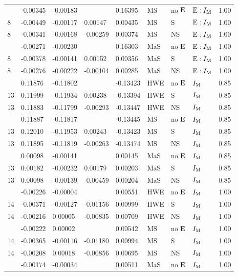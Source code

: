 \begin{longtable}[t]{lllllllll}
\addlinespace
8 & -0.00345 & -0.00183 &  & 0.16395 & MS & no ${\rm E}$ & ${\rm E}:I_{{\rm M}}$ & 1.00\\
8 & -0.00449 & -0.00117 & 0.00147 & 0.00435 & MS & S & ${\rm E}:I_{{\rm M}}$ & 1.00\\
8 & -0.00341 & -0.00168 & -0.00259 & 0.00374 & MS & NS & ${\rm E}:I_{{\rm M}}$ & 1.00\\
\addlinespace
8 & -0.00271 & -0.00230 &  & 0.16303 & MaS & no ${\rm E}$ & ${\rm E}:I_{{\rm M}}$ & 1.00\\
8 & -0.00378 & -0.00141 & 0.00152 & 0.00356 & MaS & S & ${\rm E}:I_{{\rm M}}$ & 1.00\\
8 & -0.00276 & -0.00222 & -0.00104 & 0.00285 & MaS & NS & ${\rm E}:I_{{\rm M}}$ & 1.00\\
\addlinespace
13 & 0.11876 & -0.11802 &  & -0.13423 & HWE & no ${\rm E}$ & $I_{{\rm M}}$ & 0.85\\
13 & 0.11999 & -0.11934 & 0.00238 & -0.13394 & HWE & S & $I_{{\rm M}}$ & 0.85\\
13 & 0.11883 & -0.11799 & -0.00293 & -0.13447 & HWE & NS & $I_{{\rm M}}$ & 0.85\\
\addlinespace
13 & 0.11887 & -0.11817 &  & -0.13445 & MS & no ${\rm E}$ & $I_{{\rm M}}$ & 0.85\\
13 & 0.12010 & -0.11953 & 0.00243 & -0.13423 & MS & S & $I_{{\rm M}}$ & 0.85\\
13 & 0.11895 & -0.11819 & -0.00263 & -0.13474 & MS & NS & $I_{{\rm M}}$ & 0.85\\
\addlinespace
13 & 0.00098 & -0.00141 &  & 0.00145 & MaS & no ${\rm E}$ & $I_{{\rm M}}$ & 0.85\\
13 & 0.00182 & -0.00232 & 0.00179 & 0.00203 & MaS & S & $I_{{\rm M}}$ & 0.85\\
13 & 0.00098 & -0.00139 & -0.00459 & 0.00204 & MaS & NS & $I_{{\rm M}}$ & 0.85\\
\addlinespace
14 & -0.00226 & -0.00004 &  & 0.00551 & HWE & no ${\rm E}$ & $I_{{\rm M}}$ & 1.00\\
14 & -0.00371 & -0.00127 & -0.01156 & 0.00999 & HWE & S & $I_{{\rm M}}$ & 1.00\\
14 & -0.00216 & 0.00005 & -0.00835 & 0.00709 & HWE & NS & $I_{{\rm M}}$ & 1.00\\
\addlinespace
14 & -0.00222 & 0.00002 &  & 0.00542 & MS & no ${\rm E}$ & $I_{{\rm M}}$ & 1.00\\
14 & -0.00365 & -0.00116 & -0.01180 & 0.00994 & MS & S & $I_{{\rm M}}$ & 1.00\\
14 & -0.00208 & 0.00018 & -0.00856 & 0.00695 & MS & NS & $I_{{\rm M}}$ & 1.00\\
\addlinespace
14 & -0.00174 & -0.00034 &  & 0.00511 & MaS & no ${\rm E}$ & $I_{{\rm M}}$ & 1.00\\

\end{longtable}
